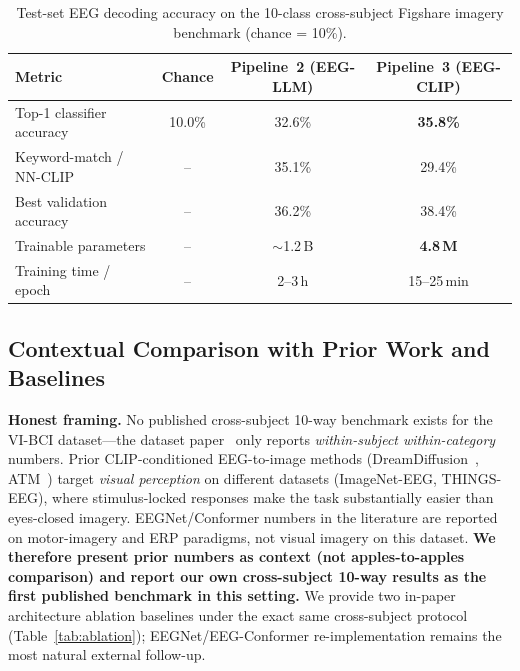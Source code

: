 \documentclass{article}
\begin{document}
\begin{table}[h]
  \centering
  \caption{Test-set EEG decoding accuracy on the 10-class cross-subject Figshare imagery benchmark (chance = 10\%).}
  \label{tab:accuracy}
  \small
  \begin{tabular}{lccc}
    \toprule
    \textbf{Metric} & \textbf{Chance} & \textbf{Pipeline~2 (EEG-LLM)} & \textbf{Pipeline~3 (EEG-CLIP)} \\
    \midrule
    Top-1 classifier accuracy      & 10.0\% & 32.6\%              & \textbf{35.8\%} \\
    Keyword-match / NN-CLIP        & --     & 35.1\%              & 29.4\% \\
    Best validation accuracy       & --     & 36.2\%              & 38.4\% \\
    Trainable parameters           & --     & $\sim$1.2\,B        & \textbf{4.8\,M} \\
    Training time / epoch          & --     & 2--3\,h             & 15--25\,min \\
    \bottomrule
  \end{tabular}
\end{table}

\subsection{Contextual Comparison with Prior Work and Baselines}
\label{sec:context}

\textbf{Honest framing.} No published cross-subject 10-way benchmark exists for the VI-BCI dataset---the dataset paper~\citep{figshare_paper} only reports \emph{within-subject within-category} numbers. Prior CLIP-conditioned EEG-to-image methods (DreamDiffusion~\citep{bai2023dreamdiffusion}, ATM~\citep{li2024atm}) target \emph{visual perception} on different datasets (ImageNet-EEG, THINGS-EEG), where stimulus-locked responses make the task substantially easier than eyes-closed imagery. EEGNet/Conformer numbers in the literature are reported on motor-imagery and ERP paradigms, not visual imagery on this dataset. \textbf{We therefore present prior numbers as context (not apples-to-apples comparison) and report our own cross-subject 10-way results as the first published benchmark in this setting.} We provide two in-paper architecture ablation baselines under the exact same cross-subject protocol (Table~\ref{tab:ablation}); EEGNet/EEG-Conformer re-implementation remains the most natural external follow-up.
\end{document}
